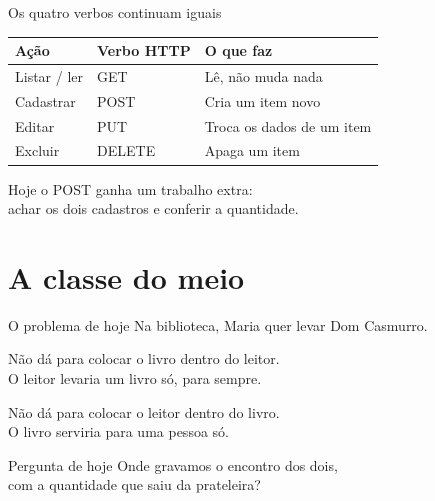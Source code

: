 \documentclass[aspectratio=169,11pt]{beamer}
\begin{document}
\begin{frame}{Os quatro verbos continuam iguais}
  \begin{center}
  \begin{tabular}{lll}
    \toprule
    Ação & Verbo HTTP & O que faz \\
    \midrule
    Listar / ler & GET & Lê, não muda nada \\
    Cadastrar & POST & Cria um item novo \\
    Editar & PUT & Troca os dados de um item \\
    Excluir & DELETE & Apaga um item \\
    \bottomrule
  \end{tabular}
  \end{center}

  \vspace{0.7em}
  Hoje o POST ganha um trabalho extra:\\
  achar os dois cadastros e conferir a quantidade.
\end{frame}

\section{A classe do meio}

\begin{frame}{O problema de hoje}
  Na biblioteca, Maria quer levar Dom Casmurro.

  \vspace{0.5em}
  Não dá para colocar o livro dentro do leitor.\\
  O leitor levaria um livro só, para sempre.

  \vspace{0.5em}
  Não dá para colocar o leitor dentro do livro.\\
  O livro serviria para uma pessoa só.

  \vspace{0.5em}
  \begin{block}{Pergunta de hoje}
    Onde gravamos o encontro dos dois,\\
    com a quantidade que saiu da prateleira?
  \end{block}
\end{frame}
\end{document}
